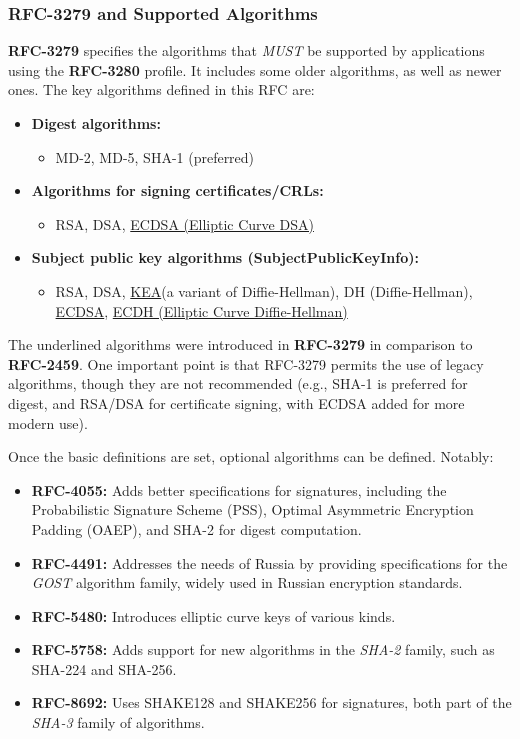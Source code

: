 \subsubsection{RFC-3279 and Supported Algorithms}

\textbf{RFC-3279} specifies the algorithms that \emph{MUST} be 
supported by applications using the \textbf{RFC-3280} profile. 
It includes some older algorithms, as well as newer ones. The key 
algorithms defined in this RFC are:

\begin{itemize}
  \item \textbf{Digest algorithms:}
  \begin{itemize}
    \item MD-2, MD-5, SHA-1 (preferred)
  \end{itemize}
  \item \textbf{Algorithms for signing certificates/CRLs:}
  \begin{itemize}
    \item RSA, DSA, \underline{ECDSA (Elliptic Curve DSA)}
  \end{itemize}
  \item \textbf{Subject public key algorithms (SubjectPublicKeyInfo):}
  \begin{itemize}
    \item RSA, DSA, \underline{KEA}(a variant of Diffie-Hellman), DH
      (Diffie-Hellman), \underline{ECDSA}, \underline{ECDH (Elliptic
      Curve Diffie-Hellman)}
  \end{itemize}
\end{itemize}

The underlined algorithms were introduced in \textbf{RFC-3279} in 
comparison to \textbf{RFC-2459}. One important point is that RFC-3279 
permits the use of legacy algorithms, though they are not recommended 
(e.g., SHA-1 is preferred for digest, and RSA/DSA for certificate 
signing, with ECDSA added for more modern use). 

Once the basic definitions are set, optional algorithms can be defined. 
Notably:

\begin{itemize}
  \item \textbf{RFC-4055:} Adds better specifications for signatures, 
    including the Probabilistic Signature Scheme (PSS), Optimal 
    Asymmetric Encryption Padding (OAEP), and SHA-2 for digest 
    computation.
  \item \textbf{RFC-4491:} Addresses the needs of Russia by providing 
    specifications for the \emph{GOST} algorithm family, widely used 
    in Russian encryption standards.
  \item \textbf{RFC-5480:} Introduces elliptic curve keys of various 
    kinds.
  \item \textbf{RFC-5758:} Adds support for new algorithms in the 
    \emph{SHA-2} family, such as SHA-224 and SHA-256.
  \item \textbf{RFC-8692:} Uses SHAKE128 and SHAKE256 for signatures, 
    both part of the \emph{SHA-3} family of algorithms.
\end{itemize}

